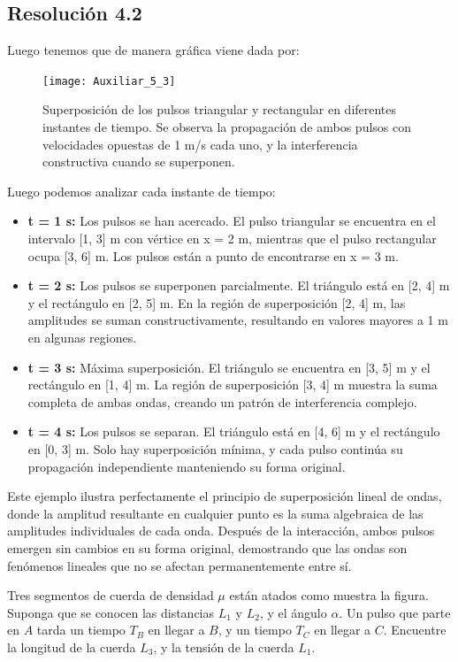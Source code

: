 \documentclass[
  11pt,
  letterpaper,
   addpoints,
  ]{exam}
\begin{document}
\begin{questions}
\begin{solution}
\subsection*{Resolución 4.2}

Luego tenemos que de manera gráfica viene dada por:

\begin{figure}[H]
\centering
\texttt{[image: Auxiliar\_5\_3]}
\caption{Superposición de los pulsos triangular y rectangular en diferentes instantes de tiempo. Se observa la propagación de ambos pulsos con velocidades opuestas de 1 m/s cada uno, y la interferencia constructiva cuando se superponen.}
\end{figure}

Luego podemos analizar cada instante de tiempo:
\begin{itemize}
\item \textbf{t = 1 s:} Los pulsos se han acercado. El pulso triangular se encuentra en el intervalo [1, 3] m con vértice en x = 2 m, mientras que el pulso rectangular ocupa [3, 6] m. Los pulsos están a punto de encontrarse en x = 3 m.

\item \textbf{t = 2 s:} Los pulsos se superponen parcialmente. El triángulo está en [2, 4] m y el rectángulo en [2, 5] m. En la región de superposición [2, 4] m, las amplitudes se suman constructivamente, resultando en valores mayores a 1 m en algunas regiones.

\item \textbf{t = 3 s:} Máxima superposición. El triángulo se encuentra en [3, 5] m y el rectángulo en [1, 4] m. La región de superposición [3, 4] m muestra la suma completa de ambas ondas, creando un patrón de interferencia complejo.

\item \textbf{t = 4 s:} Los pulsos se separan. El triángulo está en [4, 6] m y el rectángulo en [0, 3] m. Solo hay superposición mínima, y cada pulso continúa su propagación independiente manteniendo su forma original.
\end{itemize}

Este ejemplo ilustra perfectamente el principio de superposición lineal de ondas, donde la amplitud resultante en cualquier punto es la suma algebraica de las amplitudes individuales de cada onda. Después de la interacción, ambos pulsos emergen sin cambios en su forma original, demostrando que las ondas son fenómenos lineales que no se afectan permanentemente entre sí.
\end{solution}
\question  Tres segmentos de cuerda de densidad $\mu$ están atados como muestra la figura. 
Suponga que se conocen las distancias $L_1$ y $L_2$, y el ángulo $\alpha$. 
Un pulso que parte en $A$ tarda un tiempo $T_B$ en llegar a $B$, y un tiempo $T_C$ en llegar a $C$. Encuentre la longitud de la cuerda $L_3$, y la tensión de la cuerda $L_1$.


\end{questions}
\end{document}
